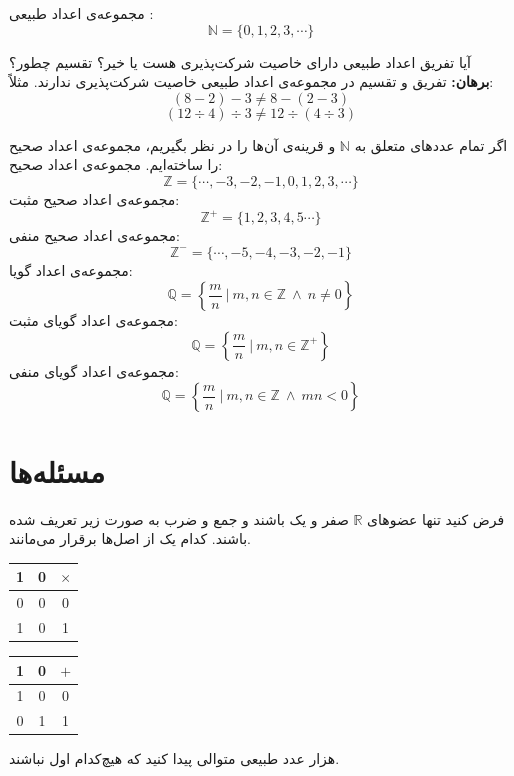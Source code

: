 مجموعه‌ی اعداد طبیعی%
:
$$\mathbb{N} = \{0,1,2,3, \cdots\}$$
\begin{example}
	آیا تفریق اعداد طبیعی دارای خاصیت شرکت‌پذیری‌ هست یا خیر؟ تقسیم چطور؟
	\\ \textbf{برهان:}
	تفریق و تقسیم در مجموعه‌ی اعداد طبیعی خاصیت شرکت‌پذیری ندارند. مثلاً:
	$$(8-2)-3 \neq 8-(2-3)$$
	$$(12 \div 4) \div 3 \neq 12 \div (4 \div 3)$$
\end{example}
\smallskip
اگر تمام عددهای متعلق به
$\mathbb{N}$
و قرینه‌ی آن‌ها را در نظر بگیریم، مجموعه‌ی اعداد صحیح را ساخته‌ایم.
مجموعه‌ی اعداد صحیح:
$$\mathbb{Z} = \{\cdots, -3,-2,-1,0,1,2,3, \cdots\}$$
مجموعه‌ی اعداد صحیح مثبت:
$$\mathbb{Z}^+ = \{1,2,3,4,5 \cdots\}$$
مجموعه‌ی اعداد صحیح منفی:
$$\mathbb{Z}^- = \{\cdots, -5,-4,-3,-2,-1\}$$
مجموعه‌ی اعداد گویا:
$$\mathbb{Q} = \left\{\frac{m}{n} \ | \ m,n \in \mathbb{Z} \ \wedge \ n \neq 0\right\}$$
مجموعه‌ی اعداد گویای مثبت:
$$\mathbb{Q} = \left\{\frac{m}{n} \ | \ m,n \in \mathbb{Z}^+\right\}$$
مجموعه‌ی اعداد گویای منفی:
$$\mathbb{Q} = \left\{\frac{m}{n} \ | \ m,n \in \mathbb{Z} \ \wedge \ mn<0\right\}$$

\section{مسئله‌ها}
\begin{problem} \label{nuprR01+*}
	فرض کنید تنها عضوهای
	$\mathbb{R}$
	صفر و یک باشند و جمع و ضرب به صورت زیر تعریف شده باشند. کدام یک از اصل‌ها برقرار می‌مانند.
	\begin{table}[H]
		\centering
		\begin{tabular}{cc|c}
			1 & 0 & $\times$ \\
			\hline
			0 & 0 & 0 \\
			1 & 0 & 1
		\end{tabular}
		\qquad \qquad \qquad
		\begin{tabular}{cc|c}
			1 & 0 & $+$ \\
			\hline
			1 & 0 & 0 \\
			0 & 1 & 1
		\end{tabular}
	\end{table}
\end{problem}
\begin{problem} \label{nupr1000prnu}
	هزار عدد طبیعی متوالی پیدا کنید که هیچ‌کدام اول نباشند.
\end{problem}
